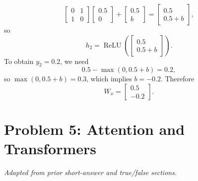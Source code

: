 \begin{enumerate}[label=(\alph*)]
{\begin{enumerate}[label=(\roman*)]
\[\begin{bmatrix}
0 & 1 \\
1 & 0
\end{bmatrix}
\begin{bmatrix}
0.5 \\
0
\end{bmatrix}
+
\begin{bmatrix}
0.5 \\
b
\end{bmatrix}
=
\begin{bmatrix}
0.5 \\
0.5+b
\end{bmatrix},
\]
so
\[
h_2 = \operatorname{ReLU}\!\left(
\begin{bmatrix}
0.5 \\
0.5+b
\end{bmatrix}
\right).
\]
To obtain \(y_2 = 0.2\), we need
\[
0.5 - \max(0, 0.5+b) = 0.2,
\]
so \(\max(0,0.5+b)=0.3\), which implies \(b=-0.2\). Therefore
\[
W_x =
\begin{bmatrix}
0.5 \\
-0.2
\end{bmatrix}.
\]
\end{enumerate}}
\end{enumerate}



\section*{Problem 5: Attention and Transformers}
\textit{Adapted from prior short-answer and true/false sections.}

